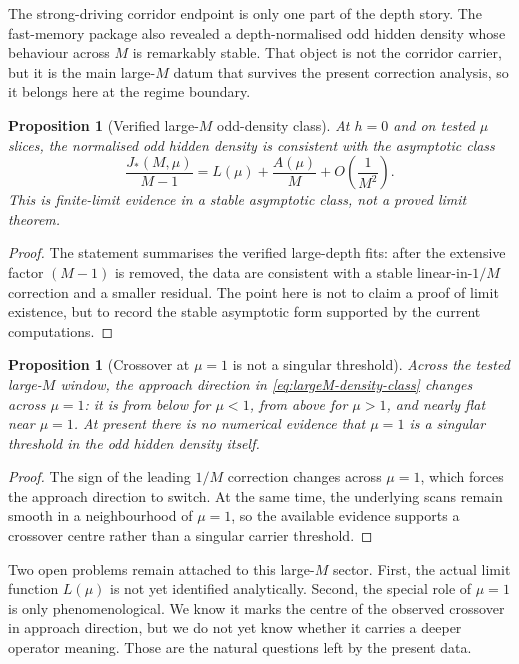 \documentclass[11pt]{article}
\numberwithin{equation}{section}
\theoremstyle{thmcompact}
\newtheorem{proposition}[theorem]{Proposition}
\theoremstyle{remark}
\begin{document}
The strong-driving corridor endpoint is only one part of the depth story. The fast-memory package also revealed a depth-normalised odd hidden density whose behaviour across $M$ is remarkably stable. That object is not the corridor carrier, but it is the main large-$M$ datum that survives the present correction analysis, so it belongs here at the regime boundary.

\begin{proposition}[Verified large-$M$ odd-density class]\label{prop:large-M-odd-density}
At $h=0$ and on tested $\mu$ slices, the normalised odd hidden density is consistent with the asymptotic class
\begin{equation}\label{eq:largeM-density-class}
\frac{J_*(M,\mu)}{M-1}=L(\mu)+\frac{A(\mu)}{M}+O\!\left(\frac{1}{M^2}\right).
\end{equation}
This is finite-limit evidence in a stable asymptotic class, not a proved limit theorem.
\end{proposition}

\begin{proof}
The statement summarises the verified large-depth fits: after the extensive factor $(M-1)$ is removed, the data are consistent with a stable linear-in-$1/M$ correction and a smaller residual. The point here is not to claim a proof of limit existence, but to record the stable asymptotic form supported by the current computations.
\end{proof}

\begin{proposition}[Crossover at $\mu=1$ is not a singular threshold]\label{prop:mu-one-crossover}
Across the tested large-$M$ window, the approach direction in \eqref{eq:largeM-density-class} changes across $\mu=1$: it is from below for $\mu<1$, from above for $\mu>1$, and nearly flat near $\mu=1$. At present there is no numerical evidence that $\mu=1$ is a singular threshold in the odd hidden density itself.
\end{proposition}

\begin{proof}
The sign of the leading $1/M$ correction changes across $\mu=1$, which forces the approach direction to switch. At the same time, the underlying scans remain smooth in a neighbourhood of $\mu=1$, so the available evidence supports a crossover centre rather than a singular carrier threshold.
\end{proof}

Two open problems remain attached to this large-$M$ sector. First, the actual limit function $L(\mu)$ is not yet identified analytically. Second, the special role of $\mu=1$ is only phenomenological. We know it marks the centre of the observed crossover in approach direction, but we do not yet know whether it carries a deeper operator meaning. Those are the natural questions left by the present data.
\end{document}
